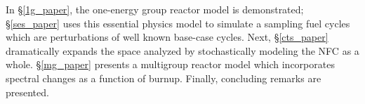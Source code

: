 In \S \ref{1g_paper}, the one-energy group reactor model is demonstrated; \S \ref{ses_paper}
uses this essential physics model to simulate a sampling fuel cycles which are perturbations of 
well known base-case cycles.  Next, \S \ref{cts_paper} dramatically
expands the space analyzed by stochastically 
modeling the NFC as a whole. \S \ref{mg_paper} presents a multigroup reactor
model which incorporates spectral changes as a function of burnup.  Finally, concluding remarks
are presented.

